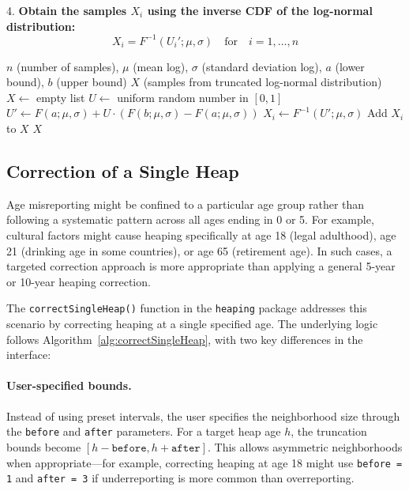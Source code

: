 \documentclass[12pt]{article}
\theoremstyle{plain}
\theoremstyle{definition}
\begin{document}
4. \textbf{Obtain the samples \( X_i \) using the inverse CDF of the log-normal distribution:}
   \[
   X_i = F^{-1}(U_i'; \mu, \sigma) \quad \text{for} \quad i = 1, \ldots, n
   \]


\begin{algorithm}
\caption{Generate Truncated Log-Normal Samples}\label{alg:truncatedLogNormal}
\begin{algorithmic}[1]
\Require $n$ (number of samples), $\mu$ (mean log), $\sigma$ (standard deviation log), $a$ (lower bound), $b$ (upper bound)
\Ensure $X$ (samples from truncated log-normal distribution)
\State $X \gets$ empty list
    \State $U \gets$ uniform random number in $[0, 1]$
    \State $U' \gets F(a; \mu, \sigma) + U \cdot (F(b; \mu, \sigma) - F(a; \mu, \sigma))$
    \State $X_i \gets F^{-1}(U'; \mu, \sigma)$
    \State Add $X_i$ to $X$
\EndFor
\State \Return $X$
\end{algorithmic}
\end{algorithm}


\subsection{Correction of a Single Heap}

Age misreporting might be confined to a particular age group rather than following a systematic pattern across all ages ending in 0 or 5. For example, cultural factors might cause heaping specifically at age 18 (legal adulthood), age 21 (drinking age in some countries), or age 65 (retirement age). In such cases, a targeted correction approach is more appropriate than applying a general 5-year or 10-year heaping correction.

The \texttt{correctSingleHeap()} function in the \texttt{heaping} package addresses this scenario by correcting heaping at a single specified age. The underlying logic follows Algorithm~\ref{alg:correctSingleHeap}, with two key differences in the interface:

\paragraph{User-specified bounds.} Instead of using preset intervals, the user specifies the neighborhood size through the \texttt{before} and \texttt{after} parameters. For a target heap age $h$, the truncation bounds become $[h - \texttt{before}, h + \texttt{after}]$. This allows asymmetric neighborhoods when appropriate---for example, correcting heaping at age 18 might use \texttt{before = 1} and \texttt{after = 3} if underreporting is more common than overreporting.
\end{document}
